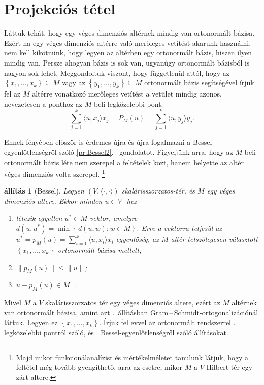 \documentclass[9pt, a4paper, showtrims]{memoir}
\makeatletter
\renewenvironment{proof}[1][\proofname]
    {\par\pushQED{\qed}%
    \normalfont \topsep6\p@\@plus6\p@\relax
    \trivlist
    \item[\hskip\labelsep
        \itshape
    #1\@addpunct{:}]\ignorespaces}
    {\popQED\endtrivlist\@endpefalse}
\theoremstyle{plain}
\newtheorem{proposition}{állítás}[chapter]
\theoremstyle{remark}
\theoremstyle{definition}
\newcommand{\ip}[2]{\langle#1,#2\rangle}
\makeatother
\begin{document}
\section{Projekciós tétel}
Láttuk tehát, hogy egy véges dimenziós altérnek mindig van ortonormált bázisa.
Ezért ha egy véges dimenziós altérre való merőleges vetítést akarunk használni,
nem kell kikötnünk, hogy legyen az altérben egy ortonormált bázis, hiszen ilyen mindig van.
Persze ahogyan bázis is sok van, ugyanúgy ortonormált bázisból is nagyon sok lehet.
Meggondoltuk viszont, hogy függetlenül attól, hogy az $\left\{ x_1,\ldots,x_k \right\}\subseteq M$
vagy az $\left\{ y_1,\ldots,y_k \right\}\subseteq M$ ortonormált bázis segítségével írjuk fel az $M$
altérre vonatkozó merőleges vetítést a vetület mindig azonos, nevezetesen a ponthoz az $M$-beli legközelebbi pont:
\[
	\sum_{j=1}^{k}\ip{u}{x_j}x_j
	=
	P_M\left( u \right)
	=
	\sum_{j=1}^{k}\ip{u}{y_j}y_j.
\]

Ennek fényében először is érdemes újra és újra fogalmazni a Bessel-egyenlőtlenségről szóló \ref{pr:Bessel2}.~ gondolatot.
Figyeljünk arra, hogy az $M$-beli ortonormált bázis léte nem szerepel a feltételek közt,
hanem helyette az altér véges dimenziós volta szerepel.%
\footnote{Majd mikor funkcionálanalízist és mértékelméletet tanulunk látjuk, hogy a feltétel még tovább gyengíthető,
	arra az esetre, mikor $M$ a $V$ Hilbert-tér egy zárt altere.}
\begin{proposition}[Bessel]\label{pr:Bessel3}
	Legyen $\left( V,\ip{\cdot}{\cdot} \right)$ skalárisszorzatos-tér, és $M$ egy
	véges dimenziós altere.
	Ekkor minden $u\in V$ -hez
	\begin{enumerate}
		\item létezik egyetlen $u^\ast\in M$ vektor, amelyre
		      \(
		      d\left( u,u^\ast\right)
		      =
		      \min\left\{ d\left( u,w \right):w\in M \right\}.
		      \)
		      Erre a vektorra teljesül az $u^\ast=p_M\left( u \right)=\sum_{i=1}^k\ip{u}{x_i}x_i$ egyenlőség,
		      az $M$ altér tetszőlegesen választott  $\left\{ x_1,\ldots,x_k \right\}$ ortonormált bázisa mellett;
		\item
		      $\|p_M\left( u \right)\|\leq\|u\|$;
		\item
		      \(
		      u-p_M(u)\in M^\perp.
		      \)
		      \qedhere
	\end{enumerate}
\end{proposition}
\begin{proof}
	Mivel $M$ a $V$ skalárisszorzatos tér egy véges dimenziós altere,
	ezért az $M$ altérnek van
	ortonormált bázisa, amint azt .~állításban Gram\,--\,Schmidt-ortogonalizációnál láttuk.
	Legyen ez $\left\{ x_1,\ldots,x_k \right\}$.
	Írjuk fel evvel az ortonormált rendszerrel . legközelebbi pontról szóló,
	és . Bessel-egyen\-lőt\-lenség\-ről szóló állításokat.
\end{proof}
\end{document}
